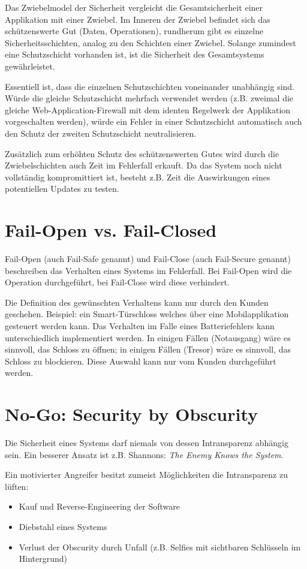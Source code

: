 Das Zwiebelmodel der Sicherheit vergleicht die Gesamtsicherheit einer Applikation mit einer Zwiebel. Im Inneren der Zwiebel befindet sich das schützenswerte Gut (Daten, Operationen), rundherum gibt es einzelne Sicherheitsschichten, analog zu den Schichten einer Zwiebel. Solange zumindest eine Schutzschicht vorhanden ist, ist die Sicherheit des Gesamtsystems gewährleistet.

Essentiell ist, dass die einzelnen Schutzschichten voneinander unabhängig sind. Würde die gleiche Schutzschicht mehrfach verwendet werden (z.B. zweimal die gleiche Web-Application-Firewall mit dem identen Regelwerk der Applikation vorgeschalten werden), würde ein Fehler in einer Schutzschicht automatisch auch den Schutz der zweiten Schutzschicht neutralisieren.

Zusätzlich zum erhöhten Schutz des schützenswerten Gutes wird durch die Zwiebelschichten auch Zeit im Fehlerfall erkauft. Da das System noch nicht vollständig kompromittiert ist, besteht z.B. Zeit die Auswirkungen eines potentiellen Updates zu testen.

\section{Fail-Open vs. Fail-Closed}

Fail-Open (auch Fail-Safe genannt) und Fail-Close (auch Fail-Secure genannt) beschreiben das Verhalten eines Systems im Fehlerfall. Bei Fail-Open wird die Operation durchgeführt, bei Fail-Close wird diese verhindert.

Die Definition des gewünschten Verhaltens kann nur durch den Kunden geschehen. Beispiel: ein Smart-Türschloss welches über eine Mobilapplikation gesteuert werden kann. Das Verhalten im Falle eines Batteriefehlers kann unterschiedlich implementiert werden. In einigen Fällen (Notausgang) wäre es sinnvoll, das Schloss zu öffnen; in einigen Fällen (Tresor) wäre es sinnvoll, das Schloss zu blockieren. Diese Auswahl kann nur vom Kunden durchgeführt werden.

\section{No-Go: Security by Obscurity}

Die Sicherheit eines Systems darf niemals von dessen Intransparenz abhängig sein. Ein besserer Ansatz ist z.B. Shannons: \textit{The Enemy Knows the System}.

Ein motivierter Angreifer besitzt zumeist Möglichkeiten die Intransparenz zu lüften:
\begin{itemize}
	\item Kauf und Reverse-Engineering der Software
	\item Diebstahl eines Systems
	\item Verlust der Obscurity durch Unfall (z.B. Selfies mit sichtbaren Schlüsseln im Hintergrund)
\end{itemize}

